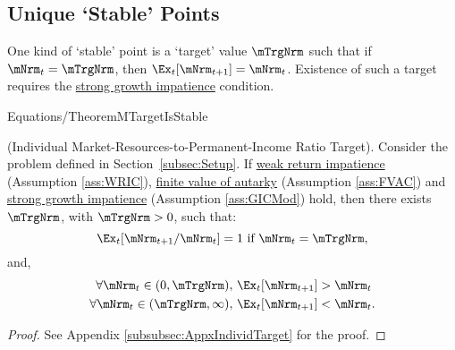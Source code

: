 \documentclass[BufferStockTheory]{subfiles}
\begin{document}

\hypertarget{onetarget}{}
\hypertarget{Unique-Stable-Points}{}


\subsection{Unique `Stable' Points}\label{subsec:onetarget}\hypertarget{TheoremTarget}{}

One kind of `stable' point is a `target' value $\mTrgNrm$ such that if $\mNrm_{t}=\mTrgNrm$, then $\Ex_{t}[\mNrm_{t+1}]=\mNrm_{t}$.
Existence of such a target requires the \hyperlink{GICMod}{strong growth impatience} condition.

\begin{verbatimwrite}{Equations/TheoremMTargetIsStable}
  \begin{theorem}\label{thm:target} (Individual Market-Resources-to-Permanent-Income Ratio Target).
    Consider the problem defined in Section~\ref{subsec:Setup}.
If \hyperlink{WRIC}{weak return impatience} (Assumption \ref{ass:WRIC}), \hyperlink{FVAC}{finite value of autarky} (Assumption \ref{ass:FVAC}) and \hyperlink{GICMod}{strong growth impatience} (Assumption \ref{ass:GICMod}) hold, then there exists $\mTrgNrm$, with $\mTrgNrm>0$, such that:
    \begin{equation}
      \Ex_t [{\mNrm}_{t+1}/\mNrm_t] = 1 \mbox{~if~} \mNrm_t = \mTrgNrm, 
      \label{eq:mTarget} %
    \end{equation}
    and, 
    \begin{equation}
      \label{eq:stability} %
      \begin{split}
        \forall {\mNrm}_t\in(0,\mTrgNrm),      \,\,& \Ex_t [{\mNrm}_{t+1}] > {\mNrm}_t  \\
        \forall {\mNrm}_t\in(\mTrgNrm,\infty), \,\,& \Ex_t [{\mNrm}_{t+1}] < {\mNrm}_t.
      \end{split}
    \end{equation}
  \end{theorem}
\end{verbatimwrite}


\begin{proof}\let\qed\relax
See Appendix \ref{subsubsec:AppxIndividTarget} for the proof.

\end{proof}
\end{document}
